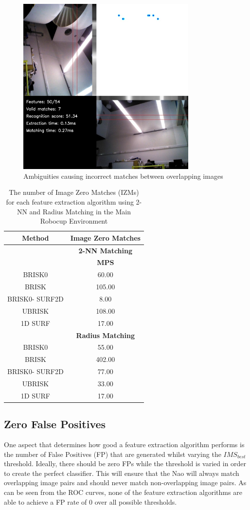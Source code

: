 \documentclass[11pt]{report}
\begin{document}
\begin{figure}
  \centering
    \includegraphics[width=0.8\textwidth]{../Drawings/Matching/nonmatching.jpg}
    \caption{Ambiguities causing incorrect matches between overlapping images} 
    \label{fig:ambiguities}
\end{figure}



\begin{table}
\caption{The number of Image Zero Matches (IZMs) for each feature extraction
algorithm using 2-NN and Radius Matching in the Main Robocup Environment}
\begin{tabular}{|c|c|}
\hline 
\textbf{Method} & \multicolumn{1}{c|}{\textbf{Image Zero Matches}}\tabularnewline
\hline 
 & \multicolumn{1}{c|}{\textbf{2-NN Matching}}\tabularnewline
\hline 
 & \textbf{MPS}\tabularnewline
\hline 
\hline 
BRISK0 & 60.00\tabularnewline
\hline 
BRISK & 105.00\tabularnewline
\hline 
BRISK0- SURF2D & 8.00\tabularnewline
\hline 
UBRISK & 108.00\tabularnewline
\hline 
1D SURF & 17.00\tabularnewline
\hline 
 & \multicolumn{1}{c|}{\textbf{Radius Matching}}\tabularnewline
\hline 
BRISK0 & 55.00\tabularnewline
\hline 
BRISK & 402.00\tabularnewline
\hline 
BRISK0- SURF2D & 77.00\tabularnewline
\hline 
UBRISK & 33.00\tabularnewline
\hline 
1D SURF & 17.00\tabularnewline
\hline 
\end{tabular}
\label{tab:mrd_izm}
\end{table}

\subsection{Zero False Positives}
\label{sec:zfp}
One aspect that determines how good a feature extraction algorithm performs is the number of False Positives (FP) that are generated whilst varying the $IMS_{best}$ threshold. Ideally, there should be zero FPs while the threshold is varied in order to create the perfect classifier. This will ensure that the Nao will always match overlapping image pairs and should never match non-overlapping image pairs. As can be seen from the ROC curves, none of the feature extraction algorithms are able to achieve a FP rate of $0$ over all possible thresholds.\\
\end{document}
